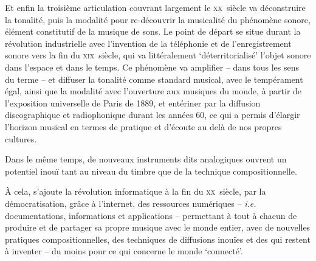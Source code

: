 \documentclass{article}
\begin{document}
Et enfin la troisième articulation couvrant largement le \textsc{xx}\ieme ~siècle va déconstruire %
la tonalité, puis la modalité pour re-découvrir la musicalité du phénomène sonore, élément constitutif de la musique de sons. Le point de départ se situe durant la révolution industrielle avec l'invention de la téléphonie et de l'enregistrement sonore vers la fin du \textsc{xix}\ieme ~siècle, qui va littéralement `déterritorialisé' %
 l'objet sonore dans l'espace et dans le temps. Ce phénomène va amplifier -- dans tous les sens du terme -- et %
 diffuser la tonalité comme standard musical, avec le tempérament égal, ainsi que la modalité avec l’ouverture aux musiques du monde, %
 à partir de l’exposition universelle de Paris de 1889, et entériner par la diffusion discographique et radiophonique durant les années 60, ce qui a permis d’élargir l’horizon musical en termes de pratique et d’écoute au delà de nos propres cultures.%

Dans le même temps, de nouveaux instruments dits analogiques ouvrent un potentiel inouï tant au niveau du timbre que de la technique compositionnelle.

À cela, s'ajoute la révolution informatique à la fin du \textsc{xx}\ieme ~siècle,  par la démocratisation, grâce à l'internet, des ressources numériques -- \textit{i.e.} documentations, informations et applications -- permettant à tout à chacun de produire et de partager sa propre musique avec le monde entier, avec de nouvelles pratiques compositionnelles, des techniques de diffusions inouïes et des qui restent à inventer -- du moins pour ce qui concerne le monde `connecté'.
\end{document}
